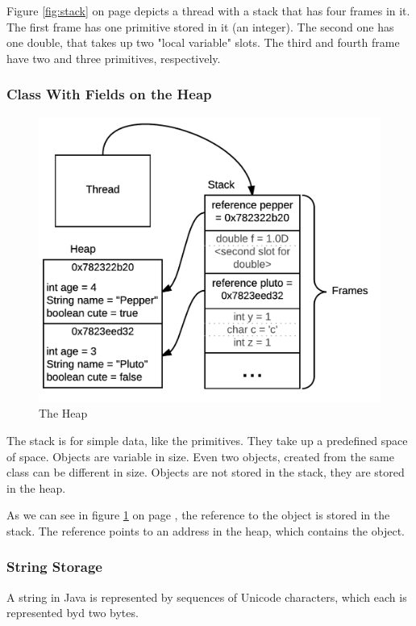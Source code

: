 Figure \ref{fig:stack} on page \pageref{fig:stack} depicts a thread with a stack that has four frames in it. The first frame has one primitive stored in it (an integer). The second one has one double, that takes up two "local variable" slots. The third and fourth frame have two and three primitives, respectively.

\subsubsection{Class With Fields on the Heap}
\begin{figure}[!h]\centering
\includegraphics[width=0.9\linewidth, frame]{images/heap}
\caption{The Heap}
\label{fig:heap}
\end{figure}
The stack is for simple data, like the primitives. They take up a predefined space of space. Objects are variable in size. Even two objects, created from the same class can be different in size. Objects are not stored in the stack, they are stored in the heap. 

As we can see in figure \ref{fig:heap} on page \pageref{fig:heap}, the reference to the object is stored in the stack. The reference points to an address in the heap, which contains the object.\cite{gosling}

\subsubsection{String Storage} A string in Java is represented by sequences of Unicode characters, which each is represented byd two bytes. 

